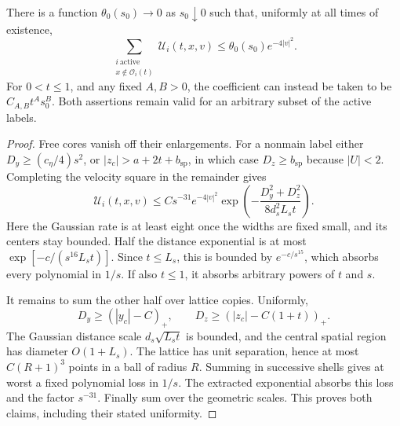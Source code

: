 \begin{lemma}\label{cold:nonmain}
There is a function \(\theta_0(s_0)\to0\) as \(s_0\downarrow0\)
such that, uniformly at all times of existence,
\begin{equation}
 \sum_{\substack{i\ \mathrm{active}\\x\notin\mathcal O_i(t)}}
       \mathcal U_i(t,x,v)
       \le\theta_0(s_0)e^{-4|v|^2}.
 \label{cold:nonmain-bound}
\end{equation}
For \(0<t\le1\), and any fixed \(A,B>0\), the coefficient can instead
be taken to be \(C_{A,B}t^A s_0^B\).  Both assertions remain valid
for an arbitrary subset of the active labels.
\end{lemma}
\begin{proof}
Free cores vanish off their enlargements.  For a nonmain label either
\(D_y\ge(c_\eta/4)s^2\), or
\(|z_c|>a+2t+b_{\mathrm{sp}}\), in which case
\(D_z\ge b_{\mathrm{sp}}\) because \(|U|<2\).
Completing the velocity square in the remainder gives
\[
 \mathcal U_i(t,x,v)
 \le C s^{-31}e^{-4|v|^2}
       \exp\left(-\frac{D_y^2+D_z^2}{8d_s^2L_st}\right).
\]
Here the Gaussian rate is at least eight once the widths are fixed
small, and its centers stay bounded.  Half the distance exponential
is at most
\(\exp[-c/(s^{16}L_st)]\).  Since \(t\le L_s\), this is bounded by
\(e^{-c/s^{15}}\), which absorbs every polynomial in \(1/s\).
If also \(t\le1\), it absorbs arbitrary powers of \(t\) and \(s\).

It remains to sum the other half over lattice copies.  Uniformly,
\[
 D_y\ge(|y_c|-C)_+,\qquad
 D_z\ge(|z_c|-C(1+t))_+.
\]
The Gaussian distance scale \(d_s\sqrt{L_st}\) is bounded, and the
central spatial region has diameter \(O(1+L_s)\).  The lattice has
unit separation, hence at most \(C(R+1)^3\) points in a ball of
radius \(R\).  Summing in successive shells gives at worst a fixed
polynomial loss in \(1/s\).  The extracted exponential absorbs this
loss and the factor \(s^{-31}\).  Finally sum over the geometric
scales.  This proves both claims, including their stated uniformity.
\end{proof}

